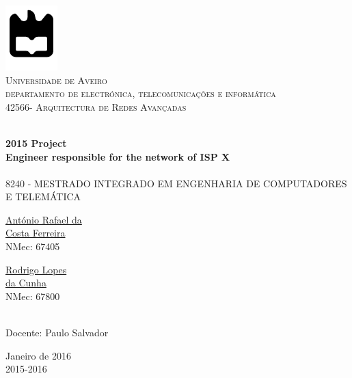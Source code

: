 \begin{titlepage}

\begin{center}

\includegraphics[width=0.15\textwidth]{./logo}\\[0.5cm]    

\textsc{\large Universidade de Aveiro \\[1cm]\large departamento de electrónica, telecomunicações e informática}\\[1cm]

\textsc{\large{42566}\large - Arquitectura de Redes Avançadas \\[1cm]}

\HRule \\[0.5cm]
{ \huge \bfseries 2015 Project}\\[0.4cm]
{ \large \bfseries Engineer responsible for the network of ISP X}\\[0.4cm]
\HRule \\[1cm]

\textsc{\small{8240 - MESTRADO INTEGRADO EM ENGENHARIA DE COMPUTADORES E TELEMÁTICA}}\\[1cm]

\begin{minipage}{0.4\textwidth}

\begin{flushleft} \large
\href{mailto:rafael.ferreira@ua.pt}{António Rafael da \\ Costa Ferreira }
 \small{\\NMec: 67405}
\end{flushleft}
\end{minipage}
\begin{minipage}{0.4\textwidth}

\begin{flushright} \large
\href{mailto:rodrigocunha@ua.pt}{Rodrigo Lopes \\ da Cunha}
\small{\\NMec: 67800}
\end{flushright}
\end{minipage}\\[1cm]

{\large Docente: Paulo Salvador }\\[0.5cm]

\vfill

{\large Janeiro de 2016 \\ 2015-2016}

\end{center}

\end{titlepage}